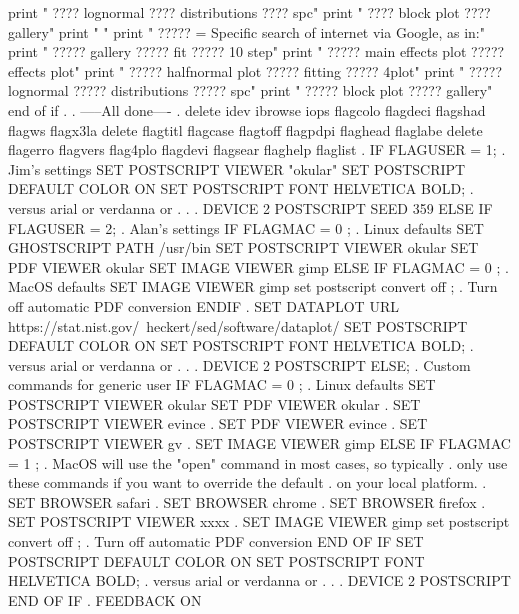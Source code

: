    print "          ???? lognormal   ???? distributions   ???? spc"
   print "          ???? block plot   ???? gallery"
   print " "
   print "  ????? = Specific search of internet via Google, as in:"
   print "          ????? gallery   ????? fit   ????? 10 step"
   print "          ????? main effects plot   ????? effects plot"
   print "          ????? halfnormal plot     ????? fitting   ????? 4plot"
   print "          ????? lognormal   ????? distributions   ????? spc"
   print "          ????? block plot   ????? gallery"
end of if
.
. -----All done----
.
delete idev ibrowse iops flagcolo flagdeci flagshad flagws flagx3la
delete flagtitl flagcase flagtoff flagpdpi flaghead flaglabe
delete flagerro flagvers flag4plo flagdevi flagsear flaghelp flaglist
.
IF FLAGUSER = 1; . Jim's settings
   SET POSTSCRIPT VIEWER "okular"
   SET POSTSCRIPT DEFAULT COLOR ON
   SET POSTSCRIPT FONT HELVETICA BOLD; . versus arial or verdanna or . . .
   DEVICE 2 POSTSCRIPT
   SEED 359
ELSE IF FLAGUSER = 2; . Alan's settings
   IF FLAGMAC = 0 ; . Linux defaults
      SET GHOSTSCRIPT PATH /usr/bin
      SET POSTSCRIPT VIEWER okular
      SET PDF VIEWER okular
      SET IMAGE VIEWER gimp
   ELSE IF FLAGMAC = 0 ; . MacOS defaults
      SET IMAGE VIEWER gimp
      set postscript convert off ; . Turn off automatic PDF conversion
   ENDIF
   . SET DATAPLOT URL https://stat.nist.gov/~heckert/sed/software/dataplot/
   SET POSTSCRIPT DEFAULT COLOR ON
   SET POSTSCRIPT FONT HELVETICA BOLD; . versus arial or verdanna or . . .
   DEVICE 2 POSTSCRIPT
ELSE; . Custom commands for generic user
   IF FLAGMAC = 0 ; . Linux defaults
      SET POSTSCRIPT VIEWER okular
      SET PDF VIEWER okular
      . SET POSTSCRIPT VIEWER evince
      . SET PDF VIEWER evince
      . SET POSTSCRIPT VIEWER gv
      . SET IMAGE VIEWER gimp
   ELSE IF FLAGMAC = 1 ;
      . MacOS will use the "open" command in most cases, so typically
      . only use these commands if you want to override the default
      . on your local platform.
      . SET BROWSER safari
      . SET BROWSER chrome
      . SET BROWSER firefox
      . SET POSTSCRIPT VIEWER xxxx
      . SET IMAGE VIEWER gimp
      set postscript convert off ; . Turn off automatic PDF conversion
   END OF IF
   SET POSTSCRIPT DEFAULT COLOR ON
   SET POSTSCRIPT FONT HELVETICA BOLD; . versus arial or verdanna or . . .
   DEVICE 2 POSTSCRIPT
END OF IF
.
FEEDBACK ON
